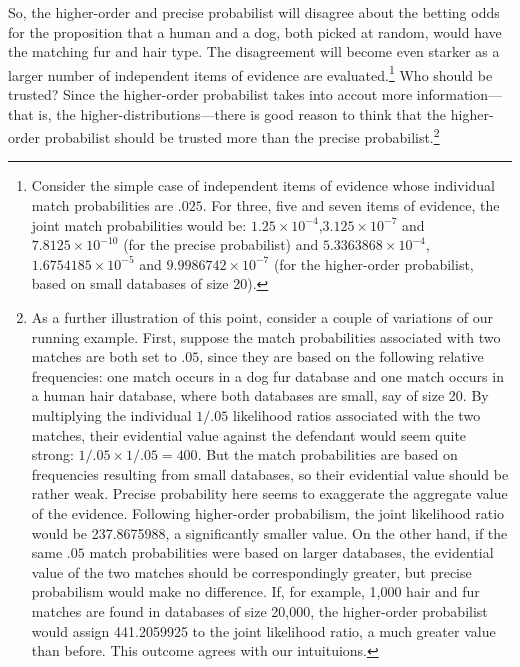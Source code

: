 \documentclass[
  letterpaper,
  DIV=11,
  numbers=noendperiod]{scrartcl}
\begin{document}
So, the higher-order and precise probabilist will disagree about the
betting odds for the proposition that a human and a dog, both picked at
random, would have the matching fur and hair type. The disagreement will
become even starker as a larger number of independent items of evidence
are evaluated.\footnote{Consider the simple case of independent items of
  evidence whose individual match probabilities are \(.025\). For three,
  five and seven items of evidence, the joint match probabilities would
  be: \ensuremath{1.25\times 10^{-4}},\ensuremath{3.125\times 10^{-7}}
  and \ensuremath{7.8125\times 10^{-10}} (for the precise probabilist)
  and \ensuremath{5.3363868\times 10^{-4}},
  \ensuremath{1.6754185\times 10^{-5}} and
  \ensuremath{9.9986742\times 10^{-7}} (for the higher-order
  probabilist, based on small databases of size 20).} Who should be
trusted? Since the higher-order probabilist takes into accout more
information---that is, the higher-distributions---there is good reason
to think that the higher-order probabilist should be trusted more than
the precise probabilist.\footnote{As a further illustration of this
  point, consider a couple of variations of our running example. First,
  suppose the match probabilities associated with two matches are both
  set to \(.05\), since they are based on the following relative
  frequencies: one match occurs in a dog fur database and one match
  occurs in a human hair database, where both databases are small, say
  of size 20. By multiplying the individual \(1/.05\) likelihood ratios
  associated with the two matches, their evidential value against the
  defendant would seem quite strong: \(1/.05\times 1/.05=400\). But the
  match probabilities are based on frequencies resulting from small
  databases, so their evidential value should be rather weak. Precise
  probability here seems to exaggerate the aggregate value of the
  evidence. Following higher-order probabilism, the joint likelihood
  ratio would be 237.8675988, a significantly smaller value. On the
  other hand, if the same \(.05\) match probabilities were based on
  larger databases, the evidential value of the two matches should be
  correspondingly greater, but precise probabilism would make no
  difference. If, for example, 1,000 hair and fur matches are found in
  databases of size 20,000, the higher-order probabilist would assign
  441.2059925 to the joint likelihood ratio, a much greater value than
  before. This outcome agrees with our intuituions.}
\end{document}
